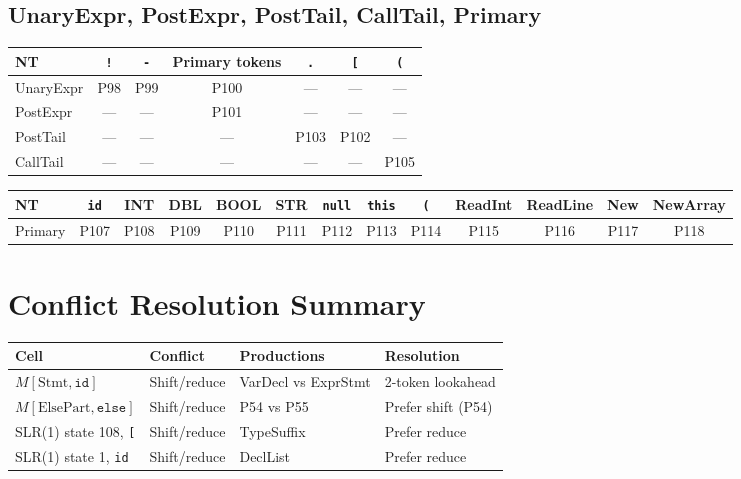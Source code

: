 \documentclass[12pt,a4paper]{article}
\begin{document}
\subsection{UnaryExpr, PostExpr, PostTail, CallTail, Primary}

\begin{center}
\begin{tabular}{l|cccccc}
\toprule
NT        & \texttt{!} & \texttt{-} & Primary tokens & \texttt{.} & \texttt{[} & \texttt{(} \\
\midrule
UnaryExpr & P98 & P99 & P100 & — & — & — \\
PostExpr  & — & — & P101 & — & — & — \\
PostTail  & — & — & — & P103 & P102 & — \\
CallTail  & — & — & — & — & — & P105 \\
\bottomrule
\end{tabular}
\end{center}

\begin{center}
\begin{tabular}{l|cccccccccccc}
\toprule
NT      & \texttt{id} & INT & DBL & BOOL & STR & \texttt{null} & \texttt{this} & \texttt{(} & ReadInt & ReadLine & New & NewArray \\
\midrule
Primary & P107 & P108 & P109 & P110 & P111 & P112 & P113 & P114 & P115 & P116 & P117 & P118 \\
\bottomrule
\end{tabular}
\end{center}

\section{Conflict Resolution Summary}

\begin{center}
\begin{tabular}{llll}
\toprule
\textbf{Cell} & \textbf{Conflict} & \textbf{Productions} & \textbf{Resolution} \\
\midrule
$M[\text{Stmt}, \texttt{id}]$   & Shift/reduce & VarDecl vs ExprStmt & 2-token lookahead \\
$M[\text{ElsePart}, \texttt{else}]$ & Shift/reduce & P54 vs P55 & Prefer shift (P54) \\
SLR(1) state 108, \texttt{[}    & Shift/reduce & TypeSuffix        & Prefer reduce \\
SLR(1) state 1, \texttt{id}     & Shift/reduce & DeclList          & Prefer reduce \\
\bottomrule
\end{tabular}
\end{center}
\end{document}
